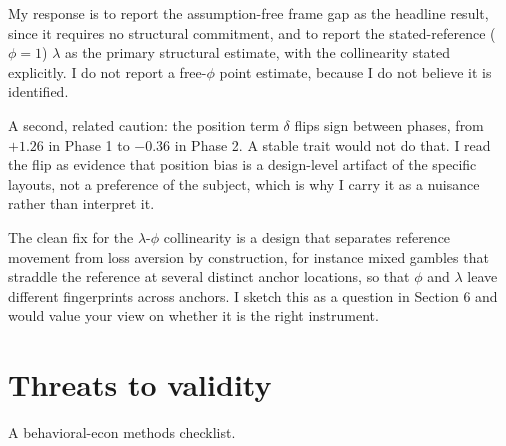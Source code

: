 \documentclass[11pt]{article}
\begin{document}
My response is to report the assumption-free frame gap as the headline result, since it requires no
structural commitment, and to report the stated-reference ($\phi = 1$) $\lambda$ as the primary structural
estimate, with the collinearity stated explicitly. I do not report a free-$\phi$ point
estimate, because I do not believe it is identified.

A second, related caution: the position term $\delta$ flips sign between phases, from $+1.26$ in Phase 1
to $-0.36$ in Phase 2. A stable trait would not do that. I read the flip as evidence that position bias is
a design-level artifact of the specific layouts, not a preference of the subject, which is why I carry it
as a nuisance rather than interpret it.

\begin{notebox}
The clean fix for the $\lambda$-$\phi$ collinearity is a design that separates reference movement from loss
aversion by construction, for instance mixed gambles that straddle the reference at several distinct anchor
locations, so that $\phi$ and $\lambda$ leave different fingerprints across anchors. I sketch this as a
question in Section 6 and would value your view on whether it is the right instrument.
\end{notebox}

\section{Threats to validity}

A behavioral-econ methods checklist.
\end{document}

